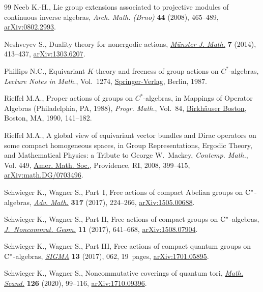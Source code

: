 \documentclass[pdftex]{sigma}
\numberwithin{equation}{section}
\begin{document}
\begin{thebibliography}{99}
Neeb K.-H., Lie group extensions associated to projective modules of continuous
 inverse algebras, \textit{Arch. Math. (Brno)} \textbf{44} (2008), 465--489,
 \href{https://arxiv.org/abs/0802.2993}{arXiv:0802.2993}.

Neshveyev S., Duality theory for nonergodic actions, \href{https://doi.org/10.17879/58269764511}{\textit{M\"unster J.
 Math.}} \textbf{7} (2014), 413--437, \href{https://arxiv.org/abs/1303.6207}{arXiv:1303.6207}.

Phillips N.C., Equivariant {$K$}-theory and freeness of group actions on
 {$C^*$}-algebras, \textit{Lecture Notes in Math.}, Vol.~1274,
 \href{https://doi.org/10.1007/BFb0078657}{Springer-Verlag}, Berlin, 1987.

Rieffel M.A., Proper actions of groups on {$C^*$}-algebras, in Mappings of
 Operator Algebras ({P}hiladelphia, {PA}, 1988), \textit{Progr. Math.},
 Vol.~84, \href{https://doi.org/10.1007/978-1-4612-0453-4_6}{Birkh\"auser Boston}, Boston, MA, 1990, 141--182.

Rieffel M.A., A global view of equivariant vector bundles and {D}irac operators
 on some compact homogeneous spaces, in Group Representations, Ergodic Theory,
 and Mathematical Physics: a Tribute to {G}eorge {W}.~{M}ackey,
 \textit{Contemp. Math.}, Vol. 449, \href{https://doi.org/10.1090/conm/449/08721}{Amer. Math. Soc.}, Providence, RI, 2008,
 399--415, \href{https://arxiv.org/abs/math.DG/0703496}{arXiv:math.DG/0703496}.

Schwieger K., Wagner S., Part~{I}, {F}ree actions of compact {A}belian groups
 on {${\rm C}^*$}-algebras, \href{https://doi.org/10.1016/j.aim.2017.06.036}{\textit{Adv. Math.}} \textbf{317} (2017), 224--266,
 \href{https://arxiv.org/abs/1505.00688}{arXiv:1505.00688}.

Schwieger K., Wagner S., Part {II}, {F}ree actions of compact groups on {$\rm
 C^*$}-algebras, \href{https://doi.org/10.4171/JNCG/11-2-6}{\textit{J.~Noncommut. Geom.}} \textbf{11} (2017), 641--668,
 \href{https://arxiv.org/abs/#2}{arXiv:1508.07904}.

Schwieger K., Wagner S., Part {III}, {F}ree actions of compact quantum groups
 on {${\rm C}^*$}-algebras, \href{https://doi.org/10.3842/SIGMA.2017.062}{\textit{SIGMA}} \textbf{13} (2017), 062, 19~pages,
 \href{https://arxiv.org/abs/1701.05895}{arXiv:1701.05895}.

Schwieger K., Wagner S., Noncommutative coverings of quantum tori,
 \href{https://doi.org/10.7146/math.scand.a-116147}{\textit{Math. Scand.}} \textbf{126} (2020), 99--116, \href{https://arxiv.org/abs/1710.09396}{arXiv:1710.09396}.


\end{thebibliography}
\end{document}

